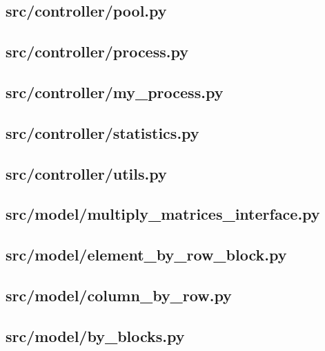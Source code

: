 \subsection{src/controller/pool.py}
	
	\newpage

\subsection{src/controller/process.py}
	
	\newpage

\subsection{src/controller/my\_process.py}
	
	\newpage

\subsection{src/controller/statistics.py}
	
	\newpage

\subsection{src/controller/utils.py}
	
	\newpage

\subsection{src/model/multiply\_matrices\_interface.py}
	
	\newpage

\subsection{src/model/element\_by\_row\_block.py}
	
	\newpage

\subsection{src/model/column\_by\_row.py}
	
	\newpage

\subsection{src/model/by\_blocks.py}
	
	\newpage

